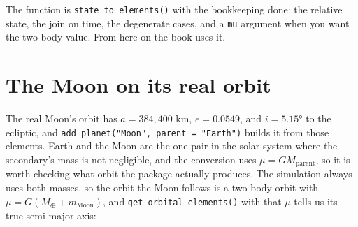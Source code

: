 \documentclass[
  10.5pt,
  letterpaper,
]{scrbook}
\newenvironment{Shaded}{\begin{snugshade}}{\end{snugshade}}
\newcommand{\AttributeTok}[1]{\textcolor[rgb]{0.00,0.00,0.00}{#1}}
\newcommand{\CommentTok}[1]{\textcolor[rgb]{0.00,0.00,0.00}{\textit{#1}}}
\newcommand{\DecValTok}[1]{\textcolor[rgb]{0.00,0.00,0.00}{#1}}
\newcommand{\FunctionTok}[1]{\textcolor[rgb]{0.00,0.00,0.00}{#1}}
\newcommand{\NormalTok}[1]{\textcolor[rgb]{0.00,0.00,0.00}{#1}}
\newcommand{\OtherTok}[1]{\textcolor[rgb]{0.00,0.00,0.00}{#1}}
\newcommand{\SpecialCharTok}[1]{\textcolor[rgb]{0.00,0.00,0.00}{#1}}
\newcommand{\StringTok}[1]{\textcolor[rgb]{0.00,0.00,0.00}{#1}}
\theoremstyle{plain}
\theoremstyle{remark}
\begin{document}
\begin{Shaded}
\end{Shaded}

The function is \texttt{state\_to\_elements()} with the bookkeeping
done: the relative state, the join on time, the degenerate cases, and a
\texttt{mu} argument when you want the two-body value. From here on the
book uses it.

\section{The Moon on its real orbit}\label{the-moon-on-its-real-orbit}

The real Moon's orbit has \(a = 384{,}400\) km, \(e = 0.0549\), and
\(i = 5.15°\) to the ecliptic, and
\texttt{add\_planet("Moon",\ parent\ =\ "Earth")} builds it from those
elements. Earth and the Moon are the one pair in the solar system where
the secondary's mass is not negligible, and the conversion uses
\(\mu = GM_{\mathrm{parent}}\), so it is worth checking what orbit the
package actually produces. The simulation always uses both masses, so
the orbit the Moon follows is a two-body orbit with
\(\mu = G(M_\oplus + m_{\mathrm{Moon}})\), and
\texttt{get\_orbital\_elements()} with that \(\mu\) tells us its true
semi-major axis:
\end{document}

